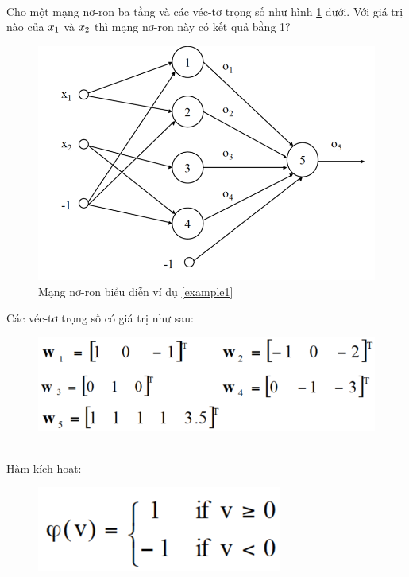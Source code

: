 \begin{exmp}
\label{example1}
\hrulefill\\
Cho một mạng nơ-ron ba tầng và các véc-tơ trọng số như hình \ref{fig:example1network} dưới. Với giá trị nào của $x\textsubscript{1}$ và $x\textsubscript{2}$ thì mạng nơ-ron này có kết quả bằng 1?

\begin{figure}[h!]
	\centering
		\includegraphics[width=0.7\columnwidth]{books/artificial-neural-network/chapter01/figure/example 1.png}
		\centering
	\caption{Mạng nơ-ron biểu diễn ví dụ \ref{example1}}
	\label{fig:example1network}
\end{figure}


\noindent Các véc-tơ trọng số có giá trị như sau:

\begin{figure}[h]
\includegraphics[width=0.6\columnwidth]{books/artificial-neural-network/chapter01/figure/example 1-weight.png}\
\end{figure}

\noindent Hàm kích hoạt:
\begin{figure}[!h]
\includegraphics[width=0.3\columnwidth]{books/artificial-neural-network/chapter01/figure/example 1-activation.png}
\end{figure}

\end{exmp}

